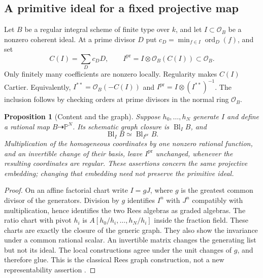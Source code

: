\documentclass[11pt,reqno]{amsart}
\numberwithin{equation}{section}
\newtheorem{proposition}[theorem]{Proposition}
\theoremstyle{definition}\newtheorem{definition}[theorem]{Definition}
\theoremstyle{remark}\newtheorem{remark}[theorem]{Remark}
\newcommand{\Pj}{\mathbb P}\newcommand{\A}{\mathbb A}
\newcommand{\OO}{\mathcal O}\newcommand{\II}{\mathcal I}
\begin{document}
\subsection{A primitive ideal for a fixed projective map}
Let $B$ be a regular integral scheme of finite type over $k$, and let
$I\subset\OO_B$ be a nonzero coherent ideal. At a prime divisor $D$ put
$c_D=\min_{f\in I}\operatorname{ord}_D(f)$, and set
\[
 C(I)=\sum_D c_DD,\qquad
 I^{\mathrm{pr}}=I\otimes\OO_B(C(I))\subset\OO_B.
\]
Only finitely many coefficients are nonzero locally. Regularity makes
$C(I)$ Cartier. Equivalently, $I^{**}=\OO_B(-C(I))$ and
$I^{\mathrm{pr}}=I\otimes(I^{**})^{-1}$. The inclusion follows by checking
orders at prime divisors in the normal ring $\OO_B$.

\begin{proposition}[Content and the graph]\label{prop:content-v169}
Suppose $h_0,\ldots,h_N$ generate $I$ and define a rational map
$B\dashrightarrow\Pj^N$. Its schematic graph closure is
$\operatorname{Bl}_I B$, and
\[
 \operatorname{Bl}_I B\simeq\operatorname{Bl}_{I^{\mathrm{pr}}}B.
\]
Multiplication of the homogeneous coordinates by one nonzero rational
function, and an invertible change of their basis, leave
$I^{\mathrm{pr}}$ unchanged, whenever the resulting coordinates are
regular. These assertions concern the same projective embedding;
changing that embedding need not preserve the primitive ideal.
\end{proposition}
\begin{proof}
On an affine factorial chart write $I=gJ$, where $g$ is the greatest
common divisor of the generators. Division by $g$ identifies
$I^n$ with $J^n$ compatibly with multiplication, hence identifies the
two Rees algebras as graded algebras. The ratio chart with pivot $h_i$
is $A[h_0/h_i,\ldots,h_N/h_i]$ inside the fraction field. These charts
are exactly the closure of the generic graph. They also show the
invariance under a common rational scalar. An invertible matrix changes
the generating list but not its ideal. The local constructions agree
under the unit changes of $g$, and therefore glue. This is the classical
Rees graph construction, not a new representability assertion
\cite{Stacks169}.
\end{proof}
\end{document}
